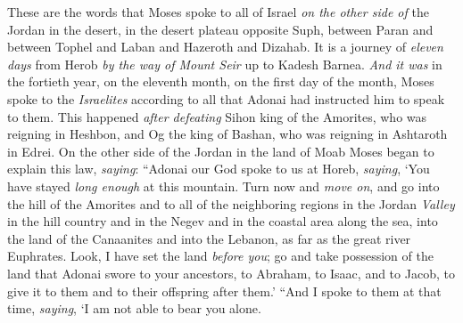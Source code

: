 
\begin{biblechapter} %
 These are the words that Moses spoke to all of Israel \textit{on the other side of} the Jordan in the desert, in the desert plateau opposite Suph, between Paran and between Tophel and Laban and Hazeroth and Dizahab.
\verse It is a journey of \textit{eleven days} from Herob \textit{by the way of Mount Seir} up to Kadesh Barnea.
\verse \textit{And it was} in the fortieth year, on the eleventh month, on the first day of the month, Moses spoke to the \textit{Israelites} according to all that Adonai had instructed him to speak to them.
\verse This happened \textit{after defeating} Sihon king of the Amorites, who was reigning in Heshbon, and Og the king of Bashan, who was reigning in Ashtaroth in Edrei.
\verse On the other side of  the Jordan in the land of Moab Moses began to explain this law, \textit{saying}:
 “Adonai our God spoke to us at Horeb, \textit{saying}, ‘You have stayed \textit{long enough} at this mountain.
\verse Turn now and \textit{move on}, and go into the hill of the Amorites and to all of the neighboring regions in the Jordan \textit{Valley} in the hill country and in the Negev and in the coastal area along the sea, into the land of the Canaanites and into the Lebanon, as far as the great river Euphrates.
\verse Look, I have set the land \textit{before you}; go and take possession of the land that Adonai swore to your ancestors, to Abraham, to Isaac, and to Jacob, to give it to them and to their offspring after them.’
\verse “And I spoke to them at that time, \textit{saying}, ‘I am not able to bear you alone.

\end{biblechapter}
